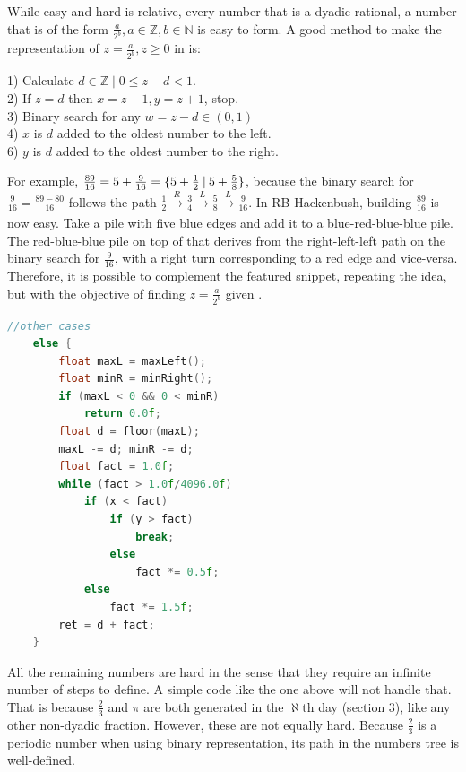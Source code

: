 While easy and hard is relative, every number that is a dyadic rational, a number that is of the form $\frac{a}{2^b}, a\in\mathbb{Z}, b \in \mathbb{N}$ is easy to form. A good method to make the representation of $z = \frac{a}{2^b}, z \ge 0$ in  is:\\
\begin{adjustwidth}{2cm}{}
	1) Calculate $d\in \mathbb{Z}\;|\;0 \leq z-d < 1$.\\
	2) If $z=d$ then $x = z-1,y=z+1$, stop.\\ 
	3) Binary search for any $w = z-d \in(0,1)$\\
	4) $x$ is $d$ added to the oldest number to the left.\\
	6) $y$ is $d$ added to the oldest number to the right.
\end{adjustwidth} \vspace{0.5cm}

For example, $\frac{89}{16} = 5 + \frac{9}{16} = \mbox{$\{5 + \frac{1}{2}\:|\:5+\frac{5}{8}\}$}$, because the binary search for $\frac{9}{16} = \frac{89-80}{16}$ follows the path $\frac{1}{2}\xrightarrow[]{R} \frac{3}{4}\xrightarrow[]{L}\frac{5}{8}\xrightarrow[]{L}\frac{9}{16}$. In RB-Hackenbush, building $\frac{89}{16}$ is now easy. Take a pile with five blue edges and add it to a blue-red-blue-blue pile. The red-blue-blue pile on top of that derives from the right-left-left path on the binary search for $\frac{9}{16}$, with a right turn corresponding to a red edge and vice-versa. Therefore, it is possible to complement the featured snippet, repeating the idea, but with the objective of finding $z = \frac{a}{2^b}$ given .

\begin{lstlisting}[language=C++]
	//other cases
	else {
		float maxL = maxLeft();
		float minR = minRight();
		if (maxL < 0 && 0 < minR)
			return 0.0f;
		float d = floor(maxL);
		maxL -= d; minR -= d;
  		float fact = 1.0f;
		while (fact > 1.0f/4096.0f)
			if (x < fact)
				if (y > fact)
					break;
				else
					fact *= 0.5f;
			else
				fact *= 1.5f;
		ret = d + fact;
	}
\end{lstlisting}

All the remaining numbers are hard in the sense that they require an infinite number of steps to define. A simple code like the one above will not handle that. That is because $\frac{2}{3}$ and $\pi$ are both generated in the $\aleph$th day (section 3), like any other non-dyadic fraction. However, these are not equally hard. Because $\frac{2}{3}$ is a periodic number when using binary representation, its path in the numbers tree is well-defined.

